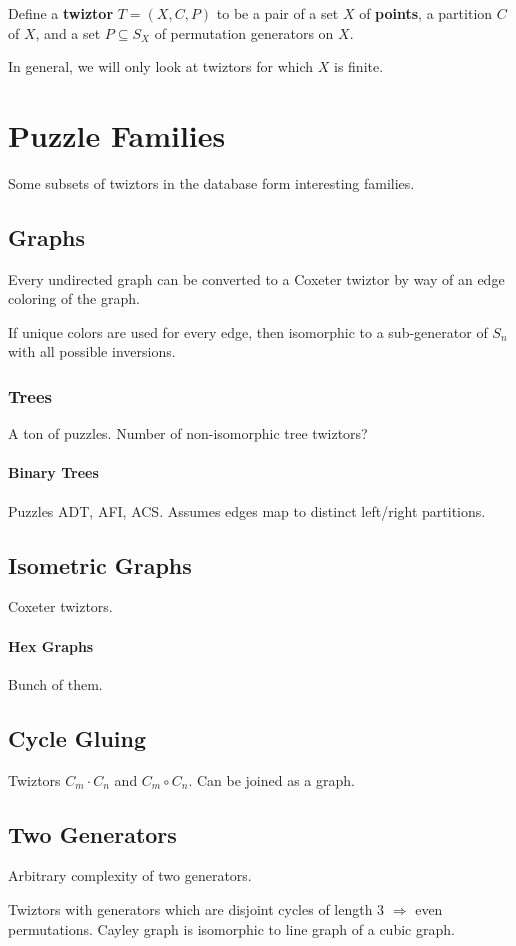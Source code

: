\documentclass{report}
\begin{document}
Define a {\bf twiztor} $T = (X, C, P)$ to be a pair of a set $X$ of {\bf points}, a partition $C$ of $X$, and a set $P\subseteq S_X$ of permutation generators on $X$.

In general, we will only look at twiztors for which $X$ is finite.

\chapter{Puzzle Families}

Some subsets of twiztors in the database form interesting families.

\section{Graphs}

Every undirected graph can be converted to a Coxeter twiztor by way of an edge coloring of the graph.

If unique colors are used for every edge, then isomorphic to a sub-generator of $S_n$ with all possible inversions.

\subsection{Trees}

A ton of puzzles.
Number of non-isomorphic tree twiztors?

\subsubsection{Binary Trees}

Puzzles ADT, AFI, ACS.
Assumes edges map to distinct left/right partitions.

\section{Isometric Graphs}
Coxeter twiztors.

\subsubsection{Hex Graphs}
Bunch of them.

\section{Cycle Gluing}
Twiztors $C_m\cdot C_n$ and $C_m\circ C_n$.  Can be joined as a graph.

\section{Two Generators}

Arbitrary complexity of two generators.

Twiztors with generators which are disjoint cycles of length $3$ $\Rightarrow $ even permutations.
Cayley graph is isomorphic to line graph of a cubic graph.
\end{document}
